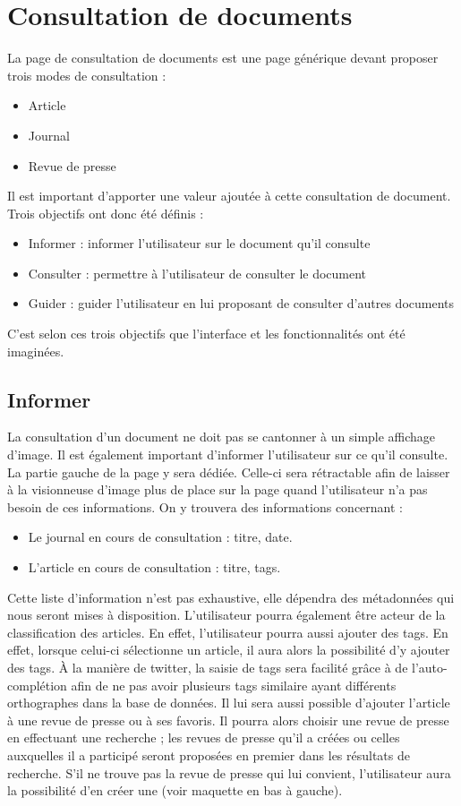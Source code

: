 \section{Consultation de documents}
\label{sec:consultation}

La page de consultation de documents est une page générique devant proposer trois modes de consultation :
\begin{itemize}
\item Article
\item Journal
\item Revue de presse
\end{itemize}

Il est important d’apporter une valeur ajoutée à cette consultation de document. Trois objectifs ont donc été définis :
\begin{itemize}
\item Informer : informer l’utilisateur sur le document qu’il consulte
\item Consulter : permettre à l’utilisateur de consulter le document
\item Guider : guider l’utilisateur en lui proposant de consulter d’autres documents
\end{itemize}
C’est selon ces trois objectifs que l’interface et les fonctionnalités ont été imaginées.


\subsection{Informer}
\label{sec:consultation_informer}
	La consultation d’un document ne doit pas se cantonner à un simple affichage d’image. Il est également important d’informer l’utilisateur sur ce qu’il consulte. La partie gauche de la page y sera dédiée. Celle-ci sera rétractable afin de laisser à la visionneuse d'image plus de place sur la page quand l'utilisateur n'a pas besoin de ces informations.
On y trouvera des informations concernant :
\begin{itemize}
\item Le journal en cours de consultation : titre, date.
\item L’article en cours de consultation : titre, tags.
\end{itemize}
\bigskip
\par
	Cette liste d’information n’est pas exhaustive, elle dépendra des métadonnées qui nous seront mises à disposition.
	L’utilisateur pourra également être acteur de la classification des articles. En effet, l'utilisateur pourra aussi ajouter des tags. En effet, lorsque celui-ci sélectionne un article, il aura alors la possibilité d'y ajouter des tags. À la manière de twitter, la saisie de tags sera facilité grâce à de l'auto-complétion afin de ne pas avoir plusieurs tags similaire ayant différents orthographes dans la base de données. Il lui sera aussi possible d’ajouter l’article à une revue de presse ou à ses favoris. Il pourra alors choisir une revue de presse en effectuant une recherche ; les revues de presse qu’il a créées ou celles auxquelles il a participé seront proposées en premier dans les résultats de recherche. S’il ne trouve pas la revue de presse qui lui convient, l’utilisateur aura la possibilité d’en créer une (voir maquette en bas à gauche). 

